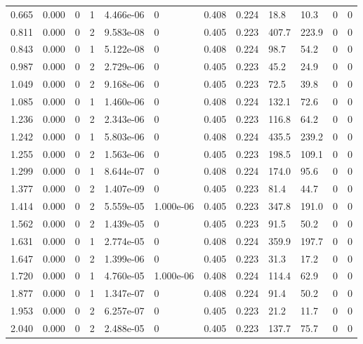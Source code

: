 \documentclass[preview]{standalone}
\begin{document}
{{\begin{tabular}{L{1.2cm}C{1.2cm} C{0.3cm}C{0.5cm} C{1.4cm}C{1.4cm} C{1.4cm}C{1.4cm} C{1.6cm}C{1.6cm} C{1.6cm}C{1.6cm}}
  0.665  &  0.000  & 0     &  1 &  4.466e-06  & 0  &  0.408&   0.224& 18.8 & 10.3   &  0 & 0  \\ 
  0.811  &  0.000  & 0     &  2 &  9.583e-08  & 0  &  0.405&   0.223& 407.7 & 223.9   &  0 & 0  \\ 
  0.843  &  0.000  & 0     &  1 &  5.122e-08  & 0  &  0.408&   0.224& 98.7 & 54.2   &  0 & 0  \\ 
  0.987  &  0.000  & 0     &  2 &  2.729e-06  & 0  &  0.405&   0.223& 45.2 & 24.9   &  0 & 0  \\ 
  1.049  &  0.000  & 0     &  2 &  9.168e-06  & 0  &  0.405&   0.223& 72.5 & 39.8   &  0 & 0  \\ 
  1.085  &  0.000  & 0     &  1 &  1.460e-06  & 0  &  0.408&   0.224& 132.1 & 72.6   &  0 & 0  \\ 
  1.236  &  0.000  & 0     &  2 &  2.343e-06  & 0  &  0.405&   0.223& 116.8 & 64.2   &  0 & 0  \\ 
  1.242  &  0.000  & 0     &  1 &  5.803e-06  & 0  &  0.408&   0.224& 435.5 & 239.2   &  0 & 0  \\ 
  1.255  &  0.000  & 0     &  2 &  1.563e-06  & 0  &  0.405&   0.223& 198.5 & 109.1   &  0 & 0  \\ 
  1.299  &  0.000  & 0     &  1 &  8.644e-07  & 0  &  0.408&   0.224& 174.0 & 95.6   &  0 & 0  \\ 
  1.377  &  0.000  & 0     &  2 &  1.407e-09  & 0  &  0.405&   0.223& 81.4 & 44.7   &  0 & 0  \\ 
  1.414  &  0.000  & 0     &  2 &  5.559e-05  & 1.000e-06  &  0.405&   0.223& 347.8 & 191.0   &  0 & 0  \\ 
  1.562  &  0.000  & 0     &  2 &  1.439e-05  & 0  &  0.405&   0.223& 91.5 & 50.2   &  0 & 0  \\ 
  1.631  &  0.000  & 0     &  1 &  2.774e-05  & 0  &  0.408&   0.224& 359.9 & 197.7   &  0 & 0  \\ 
  1.647  &  0.000  & 0     &  2 &  1.399e-06  & 0  &  0.405&   0.223& 31.3 & 17.2   &  0 & 0  \\ 
  1.720  &  0.000  & 0     &  1 &  4.760e-05  & 1.000e-06  &  0.408&   0.224& 114.4 & 62.9   &  0 & 0  \\ 
  1.877  &  0.000  & 0     &  1 &  1.347e-07  & 0  &  0.408&   0.224& 91.4 & 50.2   &  0 & 0  \\ 
  1.953  &  0.000  & 0     &  2 &  6.257e-07  & 0  &  0.405&   0.223& 21.2 & 11.7   &  0 & 0  \\ 
  2.040  &  0.000  & 0     &  2 &  2.488e-05  & 0  &  0.405&   0.223& 137.7 & 75.7   &  0 & 0  \\ 

\end{tabular}}}
\end{document}
